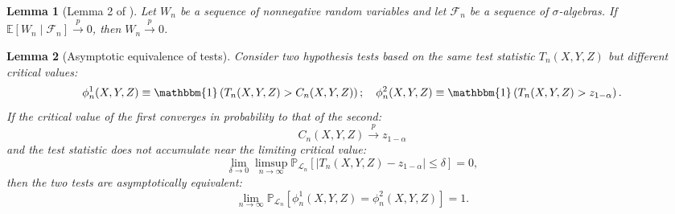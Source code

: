 \documentclass[12pt]{article}
\newtheorem{lemma}{Lemma}
\theoremstyle{definition}
\theoremstyle{remark}
\newcommand{\srx}{X}									%
\newcommand{\srz}{Z}									%
\newcommand{\sry}{Y}									%
\begin{document}
\begin{lemma}[Lemma 2 of \citet{Niu2022}]\label{lemma:conditional-expectation-covergence-to-unconditional-probability-convergence}
	Let $W_n$ be a sequence of nonnegative random variables and let $\mathcal{F}_n$ be a sequence of $\sigma$-algebras. If $\mathbb{E}\left[W_n \mid \mathcal{F}_n\right] \stackrel{p}{\rightarrow} 0$, then $W_n \stackrel{p}{\rightarrow} 0$.
\end{lemma}
\begin{lemma}[Asymptotic equivalence of tests]\label{lemma:asymptotic-equivalence-of-tests}
	Consider two hypothesis tests based on the same test statistic $T_n(\srx, \sry, \srz)$ but different critical values:
	$$
	\phi_n^1(\srx, \sry, \srz) \equiv \mathbbm{1}\left(T_n(\srx, \sry, \srz)>C_n(\srx, \sry, \srz)\right) ; \quad \phi_n^2(\srx, \sry, \srz) \equiv \mathbbm{1}\left(T_n(\srx, \sry, \srz)>z_{1-\alpha}\right) .
	$$	
	If the critical value of the first converges in probability to that of the second:
	$$
	C_n(\srx, \sry, \srz) \stackrel{p}{\rightarrow} z_{1-\alpha}
	$$
	and the test statistic does not accumulate near the limiting critical value:
	\begin{equation}
	\lim _{\delta \rightarrow 0} \limsup _{n \rightarrow \infty} \mathbb{P}_{\mathcal{L}_n}\left[\left|T_n(\srx, \sry, \srz)-z_{1-\alpha}\right| \leq \delta\right]=0,
	\label{eq:non-accumulation}
	\end{equation}
	then the two tests are asymptotically equivalent:
	$$
	\lim _{n \rightarrow \infty} \mathbb{P}_{\mathcal{L}_n}\left[\phi_n^1(\srx, \sry, \srz)=\phi_n^2(\srx, \sry, \srz)\right]=1 .
	$$
\end{lemma}
\end{document}
